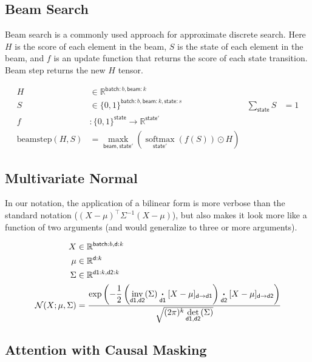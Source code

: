 \documentclass{article}
\newcommand{\name}[1]{\mathsf{#1}}
\newcommand{\ndot}[1]{\mathbin{\mathop{\thinspace\boldsymbol\cdot\thinspace}\limits_{\name{#1}}}}
\newcommand{\nsum}[1]{\mathop{\sum}_{\name{#1}}}
\newcommand{\nfun}[2]{\mathop{\text{#2}}\limits_{\name{#1}}}
\newcommand{\reals}{\mathbb{R}}
\begin{document}
\subsection{Beam Search}

Beam search is a commonly used approach for approximate discrete search. Here $H$ is the score of each element in the beam, $S$ is the state of each element in the beam, and $f$ is an update function that returns the score of each state transition. 
Beam step returns the new $H$ tensor. 

\begin{align*} 
H &\in \reals^{{ \name{batch}:b, \name{beam}:k}} \\
S &\in \{0, 1\}^{{ \name{batch}:b, \name{beam}:k, \name{state}:s}} & \nsum{state} S &= 1\\
f &\colon \{0, 1\}^{{\name{state}}} \rightarrow \reals^{{\name{state'}}} \\ 
\text{beamstep}(H, S) &=  \nfun{beam, state'}{maxk} \left( \nfun{state'}{softmax}(f(S)) \odot H  \right)
\end{align*} 

\subsection{Multivariate Normal}

In our notation, the application of a bilinear form is more verbose than the standard notation ($(X-\mu)^\top \Sigma^{-1} (X-\mu)$), but also makes it look more like a function of two arguments (and would generalize to three or more arguments).

\begin{align*} 
X &\in \reals^{\name{batch}:{b}, \name{d}:{k}}  \\
\mu &\in \reals^{{\name{d}:{k}}}  \\
\Sigma & \in   \reals^{{\name{d1}:{k}, \name{d2}:{k}}}  \\
{\cal N}(X; \mu, \Sigma) &= \frac{\displaystyle \exp\left(-\frac{1}{2}  \left(\nfun{d1, d2}{inv}(\Sigma) \ndot{d1} [X - \mu]_{\name{d} \rightarrow \name{d1}} \right) \ndot{d2} [X - \mu]_{\name{d} \rightarrow \name{d2}} \right) }{\sqrt{(2 \pi)^k \nfun{d1, d2}{det}(\Sigma)} }
\end{align*}


\subsection{Attention with Causal Masking}
\end{document}
